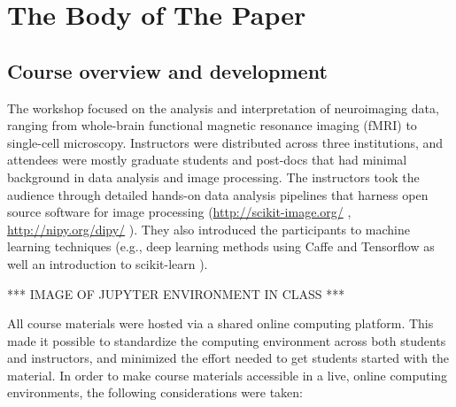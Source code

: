 \section{The Body of The Paper}

\subsection{Course overview and development}

The workshop focused on the analysis and interpretation of neuroimaging data,
ranging from whole-brain functional magnetic resonance imaging (fMRI) to
single-cell microscopy. Instructors were distributed across three institutions,
and attendees were mostly graduate students and post-docs that had minimal
background in data analysis and image processing. The instructors took the
audience through detailed hands-on data analysis pipelines that harness open
source software for image processing  (\url{http://scikit-image.org/}
\cite{van2014scikit}, \url{http://nipy.org/dipy/}
\cite{Garyfallidis2014FrontNeuroinf}). They also introduced the participants to
machine learning techniques (e.g., deep learning methods using Caffe
\cite{jia2014caffe} and Tensorflow \cite{abadi2016tensorflow} as well an
introduction to scikit-learn \cite{Pedregosa2012-dm}).

*** IMAGE OF JUPYTER ENVIRONMENT IN CLASS ***

All course materials were hosted via a shared online computing platform. This
made it possible to standardize the computing environment across both students
and instructors, and minimized the effort needed to get students started with
the material. In order to make course materials accessible in a live, online
computing environments, the following considerations were taken:

